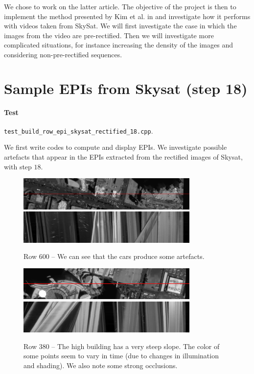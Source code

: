 \documentclass{article}
\def\epiWidth{0.8}
\theoremstyle{definition}
\begin{document}
We chose to work on the latter article. The objective of the project is then to implement the method presented by Kim et al. in \cite{art:kim13:lfields} and investigate how it performs with videos taken from SkySat. We will first investigate the case in which the images from the video are pre-rectified. Then we will investigate more complicated situations, for instance increasing the density of the images and considering non-pre-rectified sequences.


\section{Sample EPIs from Skysat (step 18)}


\paragraph{Test} \verb#test_build_row_epi_skysat_rectified_18.cpp#.


We first write codes to compute and display EPIs. We investigate possible artefacts that appear in the EPIs extracted from the rectified images of Skysat, with step $18$.


\begin{figure}[ht]
  \centering
  \includegraphics[width=\epiWidth\textwidth]{1519991014186_1st.png}\\
  \includegraphics[width=\epiWidth\textwidth]{1519991014186_epi.png}
  \caption{Row 600 -- We can see that the cars produce some artefacts.}
\end{figure}


\begin{figure}[ht]
  \centering
  \includegraphics[width=\epiWidth\textwidth]{1519991030012_1st.png}\\
  \includegraphics[width=\epiWidth\textwidth]{1519991030012_epi.png}
  \caption{Row 380 -- The high building has a very steep slope. The color of some points seem to vary in time (due to changes in illumination and shading). We also note some strong occlusions.}
\end{figure}
\end{document}
